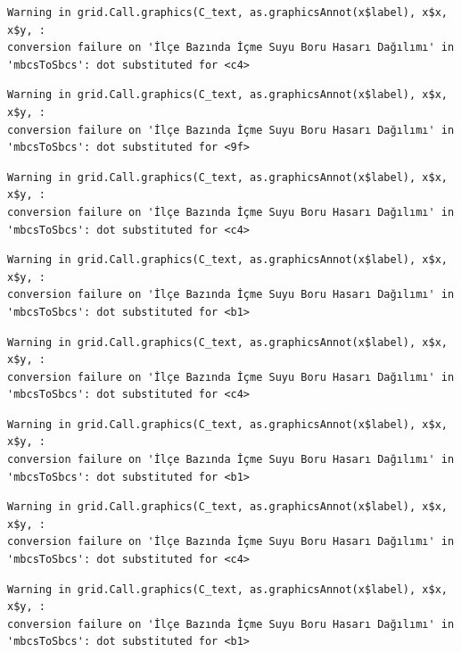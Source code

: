 \documentclass[
  11pt,
  a4paper,
  DIV=11,
  numbers=noendperiod]{scrartcl}
\begin{document}
\begin{verbatim}
Warning in grid.Call.graphics(C_text, as.graphicsAnnot(x$label), x$x, x$y, :
conversion failure on 'İlçe Bazında İçme Suyu Boru Hasarı Dağılımı' in
'mbcsToSbcs': dot substituted for <c4>
\end{verbatim}

\begin{verbatim}
Warning in grid.Call.graphics(C_text, as.graphicsAnnot(x$label), x$x, x$y, :
conversion failure on 'İlçe Bazında İçme Suyu Boru Hasarı Dağılımı' in
'mbcsToSbcs': dot substituted for <9f>
\end{verbatim}

\begin{verbatim}
Warning in grid.Call.graphics(C_text, as.graphicsAnnot(x$label), x$x, x$y, :
conversion failure on 'İlçe Bazında İçme Suyu Boru Hasarı Dağılımı' in
'mbcsToSbcs': dot substituted for <c4>
\end{verbatim}

\begin{verbatim}
Warning in grid.Call.graphics(C_text, as.graphicsAnnot(x$label), x$x, x$y, :
conversion failure on 'İlçe Bazında İçme Suyu Boru Hasarı Dağılımı' in
'mbcsToSbcs': dot substituted for <b1>
\end{verbatim}

\begin{verbatim}
Warning in grid.Call.graphics(C_text, as.graphicsAnnot(x$label), x$x, x$y, :
conversion failure on 'İlçe Bazında İçme Suyu Boru Hasarı Dağılımı' in
'mbcsToSbcs': dot substituted for <c4>
\end{verbatim}

\begin{verbatim}
Warning in grid.Call.graphics(C_text, as.graphicsAnnot(x$label), x$x, x$y, :
conversion failure on 'İlçe Bazında İçme Suyu Boru Hasarı Dağılımı' in
'mbcsToSbcs': dot substituted for <b1>
\end{verbatim}

\begin{verbatim}
Warning in grid.Call.graphics(C_text, as.graphicsAnnot(x$label), x$x, x$y, :
conversion failure on 'İlçe Bazında İçme Suyu Boru Hasarı Dağılımı' in
'mbcsToSbcs': dot substituted for <c4>
\end{verbatim}

\begin{verbatim}
Warning in grid.Call.graphics(C_text, as.graphicsAnnot(x$label), x$x, x$y, :
conversion failure on 'İlçe Bazında İçme Suyu Boru Hasarı Dağılımı' in
'mbcsToSbcs': dot substituted for <b1>
\end{verbatim}
\end{document}
